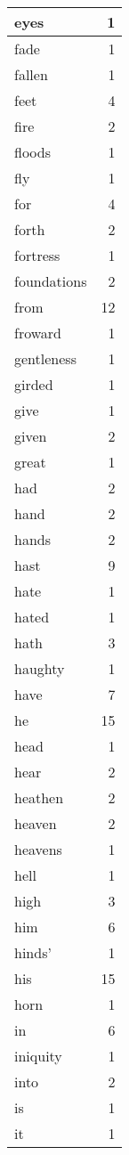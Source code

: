 \begin{center}
\begin{longtable}{l|r}
eyes & 1 \\ \hline
fade & 1 \\ \hline
fallen & 1 \\ \hline
feet & 4 \\ \hline
fire & 2 \\ \hline
floods & 1 \\ \hline
fly & 1 \\ \hline
for & 4 \\ \hline
forth & 2 \\ \hline
fortress & 1 \\ \hline
foundations & 2 \\ \hline
from & 12 \\ \hline
froward & 1 \\ \hline
gentleness & 1 \\ \hline
girded & 1 \\ \hline
give & 1 \\ \hline
given & 2 \\ \hline
great & 1 \\ \hline
had & 2 \\ \hline
hand & 2 \\ \hline
hands & 2 \\ \hline
hast & 9 \\ \hline
hate & 1 \\ \hline
hated & 1 \\ \hline
hath & 3 \\ \hline
haughty & 1 \\ \hline
have & 7 \\ \hline
he & 15 \\ \hline
head & 1 \\ \hline
hear & 2 \\ \hline
heathen & 2 \\ \hline
heaven & 2 \\ \hline
heavens & 1 \\ \hline
hell & 1 \\ \hline
high & 3 \\ \hline
him & 6 \\ \hline
hinds' & 1 \\ \hline
his & 15 \\ \hline
horn & 1 \\ \hline
in & 6 \\ \hline
iniquity & 1 \\ \hline
into & 2 \\ \hline
is & 1 \\ \hline
it & 1 \\ \hline

\end{longtable}
\end{center}
